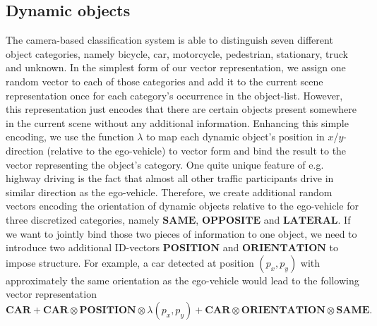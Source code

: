 \subsection{Dynamic objects}
The camera-based classification system is able to distinguish seven different object categories, namely bicycle, car, motorcycle, pedestrian, stationary, truck and unknown.
In the simplest form of our vector representation, we assign one random vector to each of those categories and add it to the current scene representation once for each category's occurrence in the object-list.
However, this representation just encodes that there are certain objects present somewhere in the current scene without any additional information.
Enhancing this simple encoding, we use the function $\lambda$ to map each dynamic object's position in $x$/$y$-direction (relative to the ego-vehicle) to vector form and bind the result to the vector representing the object's category.
One quite unique feature of e.g. highway driving is the fact that almost all other traffic participants drive in similar direction as the ego-vehicle.
Therefore, we create additional random vectors encoding the orientation of dynamic objects relative to the ego-vehicle for three discretized categories, namely $\mathbf{SAME}$, $\mathbf{OPPOSITE}$ and $\mathbf{LATERAL}$.
If we want to jointly bind those two pieces of information to one object, we need to introduce two additional ID-vectors $\mathbf{POSITION}$ and $\mathbf{ORIENTATION }$ to impose structure.
For example, a car detected at position $\left(p_x,p_y\right)$ with approximately the same orientation as the ego-vehicle would lead to the following vector representation
\[
\mathbf{CAR} + \mathbf{CAR}\otimes\mathbf{POSITION}\otimes\lambda\left(p_x,p_y\right) + \mathbf{CAR}\otimes\mathbf{ORIENTATION}\otimes\mathbf{SAME}.
\]
